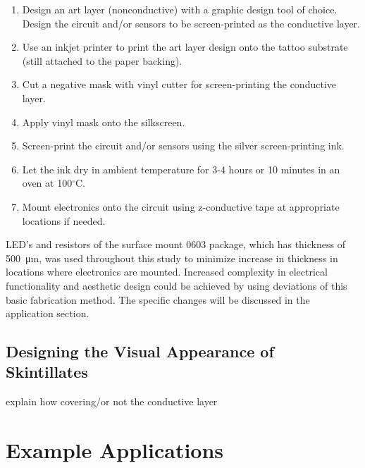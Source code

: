 \documentclass{sigchi}
\begin{document}
\begin{enumerate}
  \item Design an art layer (nonconductive) with a graphic design tool of choice. Design the circuit and/or sensors to be screen-printed as the conductive layer.
  \item Use an inkjet printer to print the art layer design onto the tattoo substrate (still attached to the paper backing). 
  \item Cut a negative mask with vinyl cutter for screen-printing the conductive layer. 
  \item Apply vinyl mask onto the silkscreen. 
  \item Screen-print the circuit and/or sensors using the silver screen-printing ink.
  \item Let the ink dry in ambient temperature for 3-4 hours or 10 minutes in an oven at 100$^{\circ}$C. 
  \item Mount electronics onto the circuit using z-conductive tape at appropriate locations if needed.   
\end{enumerate}
LED's and resistors of the surface mount 0603 package, which has thickness of  \SI{500}{\micro\metre}, was used throughout this study to minimize increase in thickness in locations where electronics are mounted. Increased complexity in electrical functionality and aesthetic design could be achieved by using deviations of this basic fabrication method. The specific changes will be discussed in the application section. 

\subsection{Designing the Visual Appearance of Skintillates}
explain how covering/or not the conductive layer

\section{Example Applications}
\end{document}
